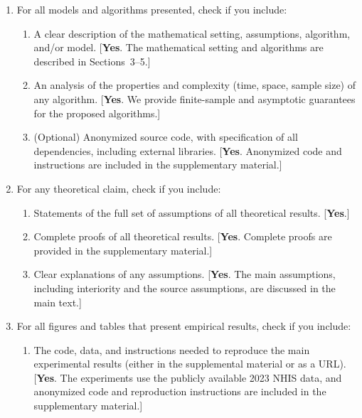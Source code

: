 \documentclass[twoside]{article}
\begin{document}
\begin{enumerate}

  \item For all models and algorithms presented, check if you include:
  \begin{enumerate}
    \item A clear description of the mathematical setting, assumptions, algorithm, and/or model.
    [\textbf{Yes}. The mathematical setting and algorithms are described in
    Sections~3--5.]

    \item An analysis of the properties and complexity (time, space, sample size) of any algorithm.
    [\textbf{Yes}. We provide finite-sample and asymptotic guarantees for the
    proposed algorithms.]

    \item (Optional) Anonymized source code, with specification of all dependencies, including external libraries.
    [\textbf{Yes}. Anonymized code and instructions are included in the
    supplementary material.]
  \end{enumerate}

  \item For any theoretical claim, check if you include:
  \begin{enumerate}
    \item Statements of the full set of assumptions of all theoretical results.
    [\textbf{Yes}.]

    \item Complete proofs of all theoretical results.
    [\textbf{Yes}. Complete proofs are provided in the supplementary material.]

    \item Clear explanations of any assumptions.
    [\textbf{Yes}. The main assumptions, including interiority and the source
    assumptions, are discussed in the main text.]
  \end{enumerate}

  \item For all figures and tables that present empirical results, check if you include:
  \begin{enumerate}
    \item The code, data, and instructions needed to reproduce the main experimental results (either in the supplemental material or as a URL).
    [\textbf{Yes}. The experiments use the publicly available 2023 NHIS data,
    and anonymized code and reproduction instructions are included in the
    supplementary material.]


\end{enumerate}
\end{enumerate}
\end{document}
